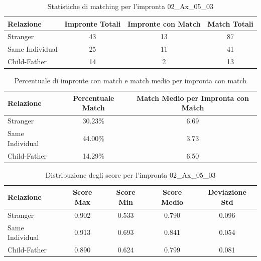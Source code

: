 \begin{table}[htbp]
\centering
\caption{Statistiche di matching per l'impronta 02\_Ax\_05\_03}
\label{tab:results_02_Ax_05_03}
\begin{tabular}{|l|c|c|c|}
\hline
\textbf{Relazione} & \textbf{Impronte Totali} & \textbf{Impronte con Match} & \textbf{Match Totali} \\
\hline
Stranger & 43 & 13 & 87 \\
\hline
Same Individual & 25 & 11 & 41 \\
\hline
Child-Father & 14 & 2 & 13 \\
\hline
\end{tabular}
\end{table}


\begin{table}[htbp]
\centering
\caption{Percentuale di impronte con match e match medio per impronta con match}
\label{tab:match_percentage_02_Ax_05_03}
\begin{tabular}{|l|c|c|}
\hline
\textbf{Relazione} & \textbf{Percentuale Match} & \textbf{Match Medio per Impronta con Match} \\
\hline
Stranger & 30.23\% & 6.69 \\
\hline
Same Individual & 44.00\% & 3.73 \\
\hline
Child-Father & 14.29\% & 6.50 \\
\hline
\end{tabular}
\end{table}


\begin{table}[htbp]
\centering
\caption{Distribuzione degli score per l'impronta 02\_Ax\_05\_03}
\label{tab:scores_02_Ax_05_03}
\begin{tabular}{|l|c|c|c|c|}
\hline
\textbf{Relazione} & \textbf{Score Max} & \textbf{Score Min} & \textbf{Score Medio} & \textbf{Deviazione Std} \\
\hline
Stranger & 0.902 & 0.533 & 0.790 & 0.096 \\
\hline
Same Individual & 0.913 & 0.693 & 0.841 & 0.054 \\
\hline
Child-Father & 0.890 & 0.624 & 0.799 & 0.081 \\
\hline
\end{tabular}
\end{table}

